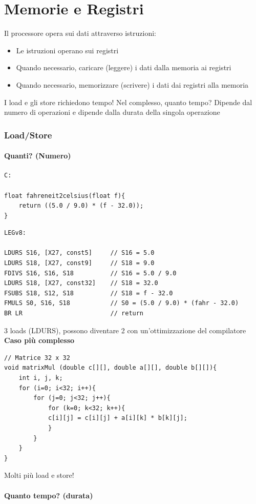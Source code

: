 \documentclass[12pt,a4paper]{article}
\begin{document}
\clearpage
\section{Memorie e Registri}
Il processore opera sui dati attraverso istruzioni:
\begin{itemize}
\item Le istruzioni operano sui registri
\item Quando necessario, caricare (leggere) i dati dalla memoria ai registri
\item Quando necessario, memorizzare (scrivere) i dati dai registri alla memoria
\end{itemize}
I load e gli store richiedono tempo! Nel complesso, quanto tempo? Dipende dal numero di operazioni e dipende dalla durata della singola operazione

\subsubsection{Load/Store}
\paragraph{Quanti? (Numero)}
\begin{verbatim}
C:

float fahreneit2celsius(float f){
    return ((5.0 / 9.0) * (f - 32.0));
}
\end{verbatim}
\begin{verbatim}
LEGv8:

LDURS S16, [X27, const5]     // S16 = 5.0
LDURS S18, [X27, const9]     // S18 = 9.0
FDIVS S16, S16, S18          // S16 = 5.0 / 9.0
LDURS S18, [X27, const32]    // S18 = 32.0
FSUBS S18, S12, S18          // S18 = f - 32.0
FMULS S0, S16, S18           // S0 = (5.0 / 9.0) * (fahr - 32.0)
BR LR                        // return
\end{verbatim}
3 loads (LDURS), possono diventare 2 con un'ottimizzazione del compilatore\\
\textbf{Caso più complesso}
\begin{verbatim}
// Matrice 32 x 32
void matrixMul (double c[][], double a[][], double b[][]){
    int i, j, k;
    for (i=0; i<32; i++){
        for (j=0; j<32; j++){
            for (k=0; k<32; k++){
            c[i][j] = c[i][j] + a[i][k] * b[k][j];
            }
        }
    }
}
\end{verbatim}
Molti più load e store!

\paragraph{Quanto tempo? (durata)}
\end{document}
